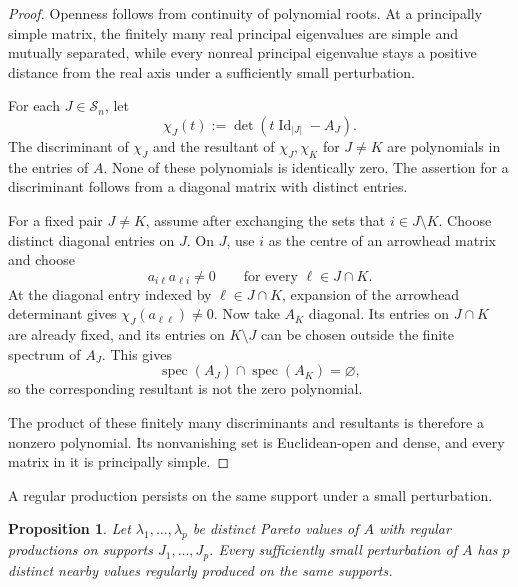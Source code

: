 \documentclass[11pt,a4paper]{article}
\newtheorem{proposition}[theorem]{Proposition}
\theoremstyle{definition}
\newcommand{\Supp}{\mathscr S}
\newcommand{\Id}{\operatorname{Id}}
\begin{document}
\begin{proof}
Openness follows from continuity of polynomial roots. At a principally
simple matrix, the finitely many real principal eigenvalues are simple
and mutually separated, while every nonreal principal eigenvalue stays
a positive distance from the real axis under a sufficiently small
perturbation.

For each $J\in\Supp_n$, let
$$
\chi_J(t):=\det(t\Id_{|J|}-A_J).
$$
The discriminant of $\chi_J$ and the resultant of $\chi_J,\chi_K$ for
$J\neq K$ are polynomials in the entries of $A$. None of these
polynomials is identically zero. The assertion for a discriminant
follows from a diagonal matrix with distinct entries.

For a fixed pair $J\neq K$, assume after exchanging the sets that
$i\in J\setminus K$. Choose distinct diagonal entries on $J$. On $J$,
use $i$ as the centre of an arrowhead matrix and choose
$$
a_{i\ell}a_{\ell i}\neq0
\qquad
\text{for every }\ell\in J\cap K.
$$
At the diagonal entry indexed by $\ell\in J\cap K$, expansion of the
arrowhead determinant gives $\chi_J(a_{\ell\ell})\neq0$. Now take
$A_K$ diagonal. Its entries on $J\cap K$ are already fixed, and its
entries on $K\setminus J$ can be chosen outside the finite spectrum of
$A_J$. This gives
$$
\operatorname{spec}(A_J)\cap\operatorname{spec}(A_K)
=\varnothing,
$$
so the corresponding resultant is not the zero polynomial.

The product of these finitely many discriminants and resultants is
therefore a nonzero polynomial. Its nonvanishing set is Euclidean-open
and dense, and every matrix in it is principally simple.
\end{proof}

A regular production persists on the same support under a small
perturbation.

\begin{proposition}
\label{prop:regular-stability}
Let $\lambda_1,\ldots,\lambda_p$ be distinct Pareto values of $A$ with
regular productions on supports $J_1,\ldots,J_p$. Every sufficiently
small perturbation of $A$ has $p$ distinct nearby values regularly
produced on the same supports.
\end{proposition}
\end{document}
